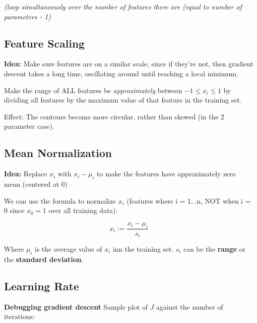 \documentclass{article}
\begin{document}
\textit{(loop simultaneously over the number of features there are (equal to number of parameters - 1)}



\subsection{Feature Scaling}


\begin{mybox}{
\textbf{Idea:} Make sure features are on a similar scale, since if they're not, then gradient descent takes a long time, oscillating around until reaching a local minimum.

Make the range of ALL features be \textit{approximately} between $-1 \leq x_i \leq 1$ by dividing all features by the maximum value of that feature in the training set.}
\end{mybox}


Effect: The contours become more circular, rather than skewed (in the 2 parameter case).




\subsection{Mean Normalization}

\begin{mybox}
\textbf{Idea:} Replace $x_i$ with $x_i - \mu_i$ to make the features have approximately zero mean (centered at 0) 

We can use the formula to normalize $x_i$ (features where i = 1...n, NOT when i = 0 since $x_0 = 1$ over all training data):

\begin{equation}
    x_i := \frac{x_i - \mu_i}{s_i}
\end{equation}

Where $\mu_i$ is the average value of $x_i$ inn the training set. $s_i$ can be the \textbf{range} or the \textbf{standard deviation}.
\end{mybox}







\subsection{Learning Rate}


\begin{center}

\textbf{Debugging gradient descent} Sample plot of $J$ against the number of iterations:

\end{center}
\end{document}
